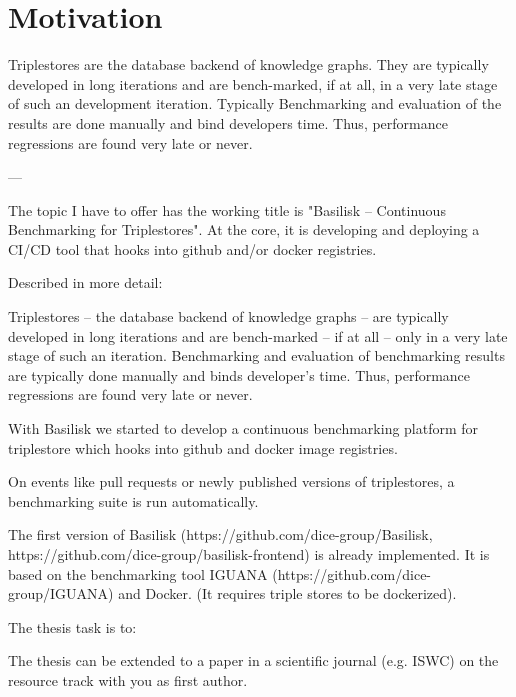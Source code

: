 \chapter{Motivation}
\label{ch:motivation}

Triplestores are the database backend of knowledge graphs. 
They are typically developed in long iterations and are bench-marked, if at all, in a very late stage of such an development iteration.
Typically Benchmarking and evaluation of the results are done manually and bind developers time.
Thus, performance regressions are found very late or never.

---


The topic I have to offer has the working title is "Basilisk -- Continuous Benchmarking for Triplestores". At the core, it is developing and deploying a CI/CD tool that hooks into github and/or docker registries.

Described in more detail:

Triplestores -- the database backend of knowledge graphs -- are
typically developed in long iterations and are bench-marked -- if at
all -- only in a very late stage of such an iteration. Benchmarking
and evaluation of benchmarking results are typically done manually
and binds developer's time. Thus, performance regressions are found
very late or never.

With Basilisk we started to develop a continuous benchmarking
platform for triplestore which hooks into github and docker image
registries.

On events like pull requests or newly published versions of
triplestores, a benchmarking suite is run automatically.

The first version of Basilisk
(https://github.com/dice-group/Basilisk,
https://github.com/dice-group/basilisk-frontend) is already
implemented. It is based on the benchmarking tool IGUANA
(https://github.com/dice-group/IGUANA) and Docker. (It requires
triple stores to be dockerized).

The thesis task is to:



The thesis can be extended to a paper in a scientific journal (e.g.
ISWC) on the resource track with you as first author. 
